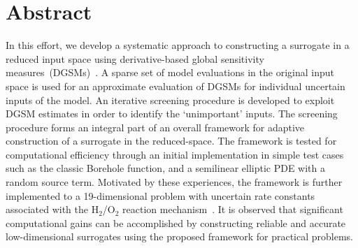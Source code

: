 \section*{Abstract}

In this effort, we develop a systematic approach to constructing a surrogate
in a reduced input space using derivative-based global sensitivity
measures~(DGSMs)~\cite{Sobol:2010}. A sparse set of model evaluations in
the original input space is used for an approximate evaluation of DGSMs
for individual uncertain inputs of the model. An iterative screening
procedure is developed to exploit DGSM estimates in order to identify
the `unimportant' inputs. The screening procedure forms an integral part
of an overall framework for adaptive construction of a surrogate in the
reduced-space. The framework is tested for computational efficiency through
an initial implementation in simple test cases such as the classic Borehole
function, and a semilinear elliptic PDE with a random source term. 
Motivated by these experiences, the framework is further implemented to
a 19-dimensional problem with uncertain rate constants associated with
the H$_2$/O$_2$ reaction mechanism~\cite{Yetter:1991}. It is observed
that significant computational gains can be accomplished by constructing
reliable and accurate low-dimensional surrogates using the proposed 
framework for practical problems. 
 
